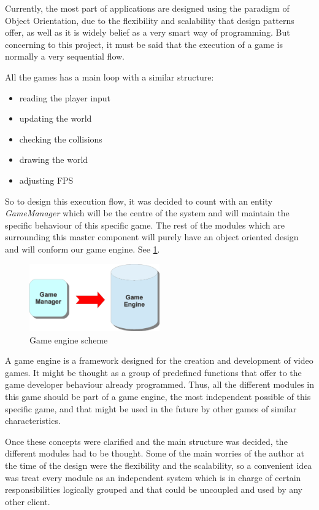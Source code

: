 \documentclass[]{article}
\begin{document}
Currently, the most part of applications are designed using the paradigm of Object Orientation, due to the flexibility and scalability that design patterns offer, as well as it is widely belief
as a very smart way of programming. But concerning to this project, it must be said that the execution of a game is normally a very sequential flow.

All the games has a main loop with a similar structure:
\begin{itemize}
 \item reading the player input
 \item updating the world
 \item checking the collisions
 \item drawing the world
 \item adjusting FPS
\end{itemize}

So to design this execution flow, it was decided to count with an entity \emph{GameManager} which will be the centre of the system and will maintain the specific behaviour of this specific game. 
The rest of the modules which are surrounding this master component will purely have an object oriented design and will conform our game engine. See \ref{fig:ge}.

\begin{figure}[h]
\begin{center}
\includegraphics[width=0.5\textwidth]{images/gameEngine.eps}
\caption{Game engine scheme}
\label{fig:ge}
\end{center}
\end{figure}

A game engine is a framework designed for the creation and development of video games. It might be thought as a group of predefined functions that offer to the game developer behaviour
already programmed. Thus, all the different modules in this game should be part of a game engine, the most independent possible of this specific game, and that might be used in the future by
other games of similar characteristics.

Once these concepts were clarified and the main structure was decided, the different modules had to be thought. Some of the main worries of the author at the time of the design were the flexibility
and the scalability, so a convenient idea was treat every module as an independent system which is in charge of certain responsibilities logically grouped and that could be uncoupled and used by any
other client. 
\end{document}
